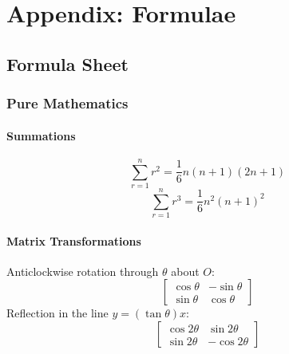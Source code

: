 \documentclass{book}
\begin{document}
\appendix
\chapter{Appendix: Formulae} \label{ch:formulae}
    \section{Formula Sheet} \label{formula_sheet}
        \subsection{Pure Mathematics}
            \subsubsection{Summations}
            \begin{equation}
                \sum_{r=1}^nr^2=\frac{1}{6}n(n+1)(2n+1)
            \end{equation}
            \begin{equation}
                \sum_{r=1}^nr^3=\frac{1}{6}n^2(n+1)^2
            \end{equation}

            \subsubsection{Matrix Transformations}
            Anticlockwise rotation through $\theta$ about $O$:
            \begin{equation}
                \begin{bmatrix}
                    \cos\theta & -\sin\theta \\
                    \sin\theta & \cos\theta
                \end{bmatrix}
            \end{equation}
            Reflection in the line $y=(\tan\theta)x$:
            \begin{equation}
                \begin{bmatrix}
                    \cos2\theta & \sin2\theta \\
                    \sin2\theta & -\cos2\theta
                \end{bmatrix}
            \end{equation}
\end{document}
